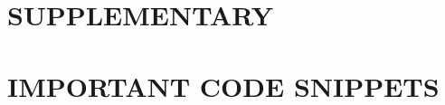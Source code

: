 \documentclass[Dual]{iitddiss}
\begin{document}
\appendix

\chapter{SUPPLEMENTARY}
\label{chap:appendix}

\pagebreak

\chapter{IMPORTANT CODE SNIPPETS}
\label{chap:code}

\pagebreak


\label{chap:references}

\pagebreak


\listofpapers

\end{document}
